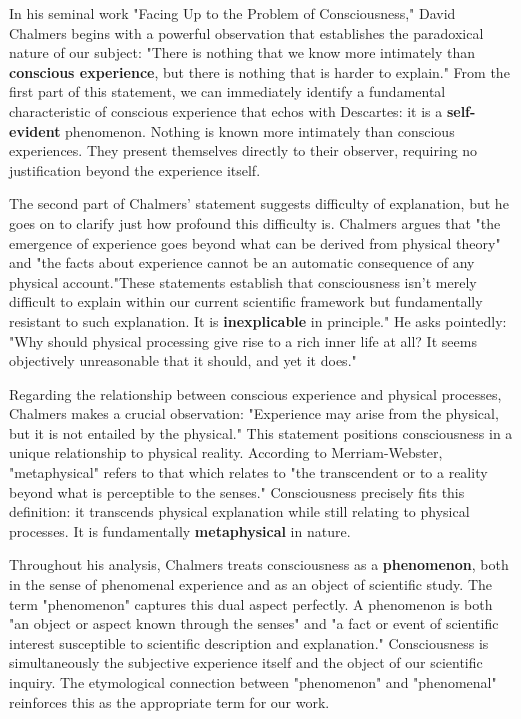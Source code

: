 \documentclass[runningheads]{llncs}
\begin{document}
In his seminal work "Facing Up to the Problem of Consciousness," David Chalmers begins with a powerful observation that establishes the paradoxical nature of our subject: "There is nothing that we know more intimately than \textbf{conscious experience}, but there is nothing that is harder to explain." From the first part of this statement, we can immediately identify a fundamental characteristic of conscious experience that echos with Descartes: it is a \textbf{self-evident} phenomenon. Nothing is known more intimately than conscious experiences. They present themselves directly to their observer, requiring no justification beyond the experience itself.

The second part of Chalmers' statement suggests difficulty of explanation, but he goes on to clarify just how profound this difficulty is. Chalmers argues that "the emergence of experience goes beyond what can be derived from physical theory" and "the facts about experience cannot be an automatic consequence of any physical account."These statements establish that consciousness isn't merely difficult to explain within our current scientific framework but fundamentally resistant to such explanation. It is \textbf{inexplicable} in principle." He asks pointedly: "Why should physical processing give rise to a rich inner life at all? It seems objectively unreasonable that it should, and yet it does."

Regarding the relationship between conscious experience and physical processes, Chalmers makes a crucial observation: "Experience may arise from the physical, but it is not entailed by the physical." This statement positions consciousness in a unique relationship to physical reality. According to Merriam-Webster, "metaphysical" refers to that which relates to "the transcendent or to a reality beyond what is perceptible to the senses." Consciousness precisely fits this definition: it transcends physical explanation while still relating to physical processes. It is fundamentally \textbf{metaphysical} in nature.

Throughout his analysis, Chalmers treats consciousness as a \textbf{phenomenon}, both in the sense of phenomenal experience and as an object of scientific study. The term "phenomenon" captures this dual aspect perfectly. A phenomenon is both "an object or aspect known through the senses" and "a fact or event of scientific interest susceptible to scientific description and explanation." Consciousness is simultaneously the subjective experience itself and the object of our scientific inquiry. The etymological connection between "phenomenon" and "phenomenal" reinforces this as the appropriate term for our work.
\end{document}
